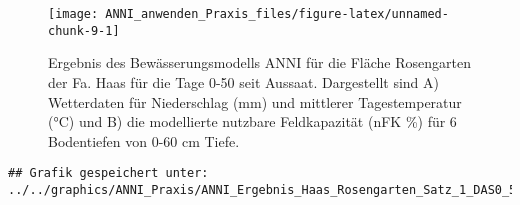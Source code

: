 \documentclass[
]{article}
\begin{document}
\hfill\break

\begin{figure}[H]
\texttt{[image: ANNI\_anwenden\_Praxis\_files/figure-latex/unnamed-chunk-9-1]} \caption{Ergebnis des Bewässerungsmodells ANNI für die Fläche Rosengarten der Fa. Haas für die Tage 0-50 seit Aussaat. Dargestellt sind A) Wetterdaten für Niederschlag (mm) und mittlerer Tagestemperatur (°C) und B) die modellierte nutzbare Feldkapazität (nFK \%) für 6 Bodentiefen von 0-60 cm Tiefe.}\label{fig:unnamed-chunk-9}
\end{figure}

\hfill\break

\hfill\break

\begin{lstlisting}
## Grafik gespeichert unter: ../../graphics/ANNI_Praxis/ANNI_Ergebnis_Haas_Rosengarten_Satz_1_DAS0_50.png
\end{lstlisting}
\end{document}
